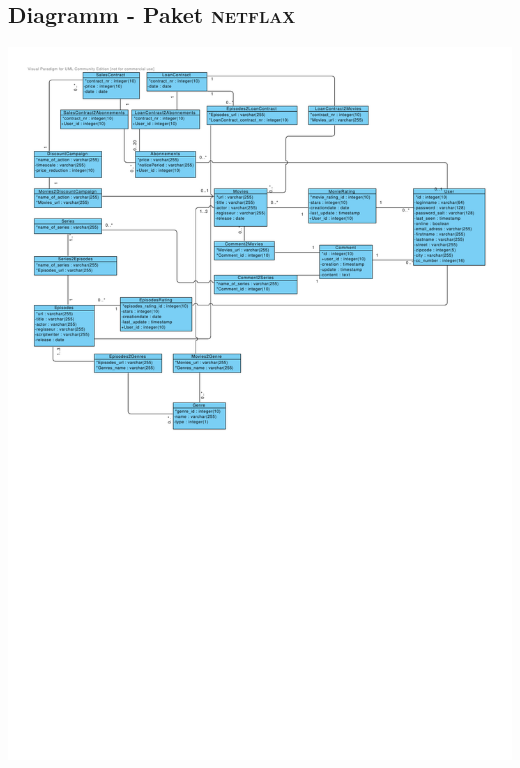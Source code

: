 \documentclass[11pt,a4paper,DIV=9]{scrartcl}
\begin{document}
\subsection{Diagramm - Paket \textsc{netflax}}
     \includegraphics[angle=90,trim=0cm 0cm 1.1cm 1cm, clip=true, scale=1]{Diagramme/Paket_Netflax}
 
\end{document}
